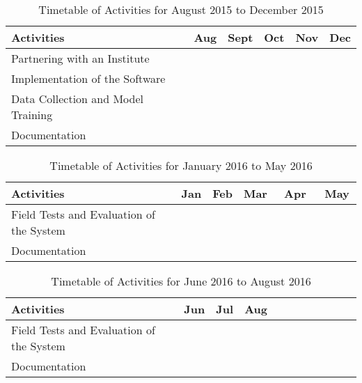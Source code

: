 \begin{table}[!htbp]
\centering
\caption{Timetable of Activities for August 2015 to December 2015} \vspace{0.25em}
\begin{tabular}{|p{2in}|c|c|c|c|c|} \hline
\centering Activities				& Aug		& Sept		& Oct			& Nov		& Dec			\\ \hline
Partnering with an Institute		& 			&			&				&\weekone~~~&				\\ \hline
Implementation of the Software		& \weekfour	& \weekfour	& \weekfour		& \weekfour	&\weektwo~~~	\\ \hline
Data Collection and Model Training	&			&			&				&			&\weektwo~~~	\\ \hline
Documentation						& \weekfour	& \weekfour	& \weekfour		& \weekfour	&\weektwo~~~	\\ \hline
\end{tabular}
\label{tab:timetableactivities2}
\end{table}

\begin{table}[!htbp]
\centering
\caption{Timetable of Activities for January 2016 to May 2016} \vspace{0.25em}
\begin{tabular}{|p{2in}|c|c|c|c|c|} \hline
\centering Activities						& Jan		& Feb		& Mar		& Apr		& May		\\ \hline
Field Tests and Evaluation of the System	&~\weekthree&\weektwo~~~&\weekfour	&~~~~~~		&~~~~~		\\ \hline
Documentation								&~\weekthree&\weektwo~~~&\weekfour	&			&			\\ \hline
\end{tabular}
\label{tab:timetableactivities3}
\end{table}

\begin{table}[!htbp]
\centering
\caption{Timetable of Activities for June 2016 to August 2016} \vspace{0.25em}
\begin{tabular}{|p{2in}|c|c|c|c|c|} \hline
\centering Activities						& Jun		& Jul		& Aug		& 			& 		\\ \hline
Field Tests and Evaluation of the System	&~~\weektwo	&			&			&~~~~~~		&~~~~~		\\ \hline
Documentation								&~~\weektwo	&\weekfour	&			&			&			\\ \hline
\end{tabular}
\label{tab:timetableactivities4}
\end{table}
